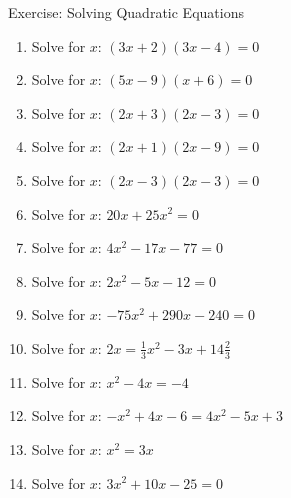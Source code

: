     \noindent
\label{m39247*secfhsst!!!underscore!!!id2946}
        {Exercise:  Solving Quadratic Equations }
            \nopagebreak
        \label{m39247*id153332}\begin{enumerate}[noitemsep, label=\textbf{\arabic*}. ] 
            \label{m39247*uid44}\item Solve for $x$: $\left(3x+2\right)\left(3x-4\right)=0$\hspace{1ex}        
\label{m39247*uid45}\item Solve for $x$: $\left(5x-9\right)\left(x+6\right)=0$\hspace{1ex}        
\label{m39247*uid46}\item Solve for $x$: $\left(2x+3\right)\left(2x-3\right)=0$\hspace{1ex}        
\label{m39247*uid47}\item Solve for $x$: $\left(2x+1\right)\left(2x-9\right)=0$\hspace{1ex}        
\label{m39247*uid48}\item Solve for $x$: $\left(2x-3\right)\left(2x-3\right)=0$\hspace{1ex}        
\label{m39247*uid49}\item Solve for $x$: $20x+25{x}^{2}=0$\hspace{1ex}        
\label{m39247*uid50}\item Solve for $x$: $4{x}^{2}-17x-77=0$\hspace{1ex}        
\label{m39247*uid51}\item Solve for $x$: $2{x}^{2}-5x-12=0$  \hspace{1ex}        
\label{m39247*uid52}\item Solve for $x$: $-75{x}^{2}+290x-240=0$\hspace{1ex}        
\label{m39247*uid53}\item Solve for $x$: $2x=\frac{1}{3}{x}^{2}-3x+14\frac{2}{3}$\hspace{1ex}        
\label{m39247*uid54}\item Solve for $x$: ${x}^{2}-4x=-4$\hspace{1ex}        
\label{m39247*uid55}\item Solve for $x$: $-{x}^{2}+4x-6=4{x}^{2}-5x+3$\hspace{1ex}        
\label{m39247*uid56}\item Solve for $x$: ${x}^{2}=3x$\hspace{1ex}        
\label{m39247*uid57}\item Solve for $x$: $3{x}^{2}+10x-25=0$\hspace{1ex}        

\end{enumerate}
